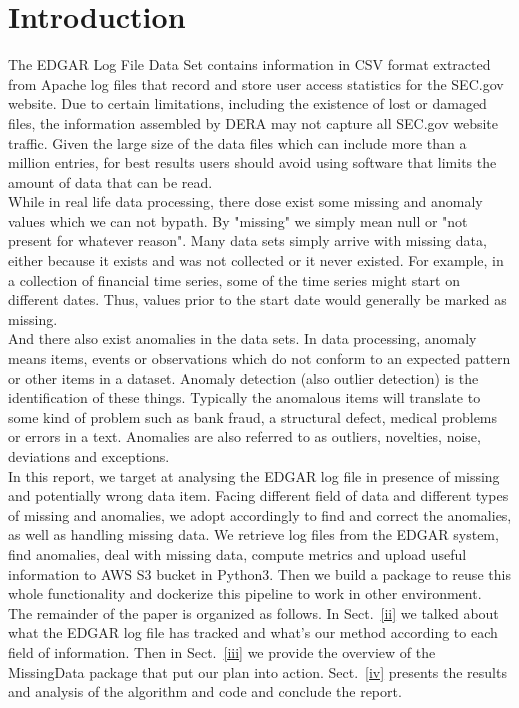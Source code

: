 \documentclass[conference]{IEEEtran}
\begin{document}
\section{Introduction}\label{i}
\indent The EDGAR Log File Data Set contains information in CSV format extracted from Apache log files that record and store user access statistics for the SEC.gov website.  Due to certain limitations, including the existence of lost or damaged files, the information assembled by DERA may not capture all SEC.gov website traffic. Given the large size of the data files which can include more than a million entries, for best results users should avoid using software that limits the amount of data that can be read.
\\
\indent While in real life data processing, there dose exist some missing and anomaly values which we can not bypath. By "missing" we simply mean null or "not present for whatever reason". Many data sets simply arrive with missing data, either because it exists and was not collected or it never existed. For example, in a collection of financial time series, some of the time series might start on different dates. Thus, values prior to the start date would generally be marked as missing.
\\
\indent And there also exist anomalies in the data sets. In data processing, anomaly means items, events or observations which do not conform to an expected pattern or other items in a dataset. Anomaly detection (also outlier detection) is the identification of these things. Typically the anomalous items will translate to some kind of problem such as bank fraud, a structural defect, medical problems or errors in a text. Anomalies are also referred to as outliers, novelties, noise, deviations and exceptions.
\\
\indent In this report, we target at analysing the EDGAR log file in presence of missing and potentially wrong data item. Facing different field of data and different types of missing and anomalies, we adopt accordingly to find and correct the anomalies, as well as handling missing data. We retrieve log files from the EDGAR system, find anomalies, deal with missing data, compute metrics and upload useful information to AWS S3 bucket in Python3. Then we build a package to reuse this whole functionality and dockerize this pipeline to work in other environment.
\\
\indent The remainder of the paper is organized as follows. In Sect.~\ref{ii} we talked about what the EDGAR log file has tracked and what's our method according to each field of information. Then in Sect.~\ref{iii} we provide the overview of the MissingData package that put our plan into action. Sect.~\ref{iv} presents the results and analysis of the algorithm and code and conclude the report.
\\
\end{document}
